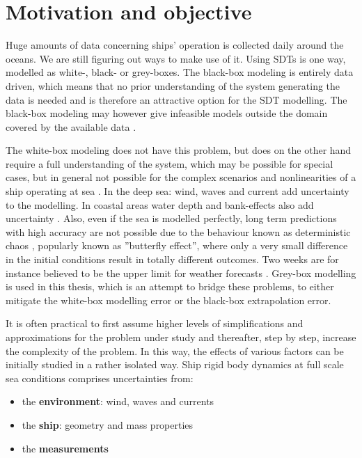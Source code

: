 \section{Motivation and objective}
\label{sec:motivation}
Huge amounts of data concerning ships' operation is collected daily around the oceans. We are still figuring out ways to make use of it. Using SDTs is one way, modelled as white-, black- or grey-boxes.
The black-box modeling is entirely data driven, which means that no prior understanding of the system generating the data is needed and is therefore an attractive option for the SDT modelling. The black-box modeling may however give infeasible models outside the domain covered by the available data \cite{nielsen_machine_2022}. 

The white-box modeling does not have this problem, but does on the other hand require a full understanding of the system, which may be possible for special cases, but in general not possible for the complex scenarios and nonlinearities of a ship operating at sea \cite{miller_ship_2021}. 
In the deep sea: wind, waves and current add uncertainty to the modelling. In coastal areas water depth and bank-effects also add uncertainty \cite{nielsen_machine_2022}. 
Also, even if the sea is modelled perfectly, long term predictions with high accuracy are not possible due to the behaviour known as deterministic chaos \cite{lorenz_deterministic_1963}, popularly known as ''butterfly effect'', where only a very small difference in the initial conditions result in totally different outcomes. Two weeks are for instance believed to be the upper limit for weather forecasts  \cite{zhang_what_2019}. Grey-box modelling is used in this thesis, which is an attempt to bridge these problems, to either mitigate the white-box modelling error or the black-box extrapolation error. 

It is often practical to first assume higher levels of simplifications and approximations for the problem under study and thereafter, step by step, increase the complexity of the problem. In this way, the effects of various factors can be initially studied in a rather isolated way. 
Ship rigid body dynamics at full scale sea conditions comprises uncertainties from:
\begin{itemize}
    \item the \textbf{environment}: wind, waves and currents
    \item the \textbf{ship}: geometry and mass properties
    \item the \textbf{measurements}
\end{itemize}

